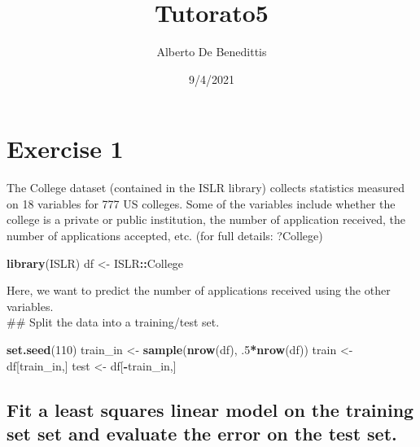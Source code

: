 \documentclass[
]{article}
\title{Tutorato5}
\author{Alberto De Benedittis}
\date{9/4/2021}
\newenvironment{Shaded}{\begin{snugshade}}{\end{snugshade}}
\newcommand{\DecValTok}[1]{\textcolor[rgb]{0.00,0.00,0.81}{#1}}
\newcommand{\FloatTok}[1]{\textcolor[rgb]{0.00,0.00,0.81}{#1}}
\newcommand{\KeywordTok}[1]{\textcolor[rgb]{0.13,0.29,0.53}{\textbf{#1}}}
\newcommand{\NormalTok}[1]{#1}
\newcommand{\OperatorTok}[1]{\textcolor[rgb]{0.81,0.36,0.00}{\textbf{#1}}}
\newcommand{\StringTok}[1]{\textcolor[rgb]{0.31,0.60,0.02}{#1}}
\begin{document}
\maketitle

\hypertarget{exercise-1}{%
\section{Exercise 1}\label{exercise-1}}

The College dataset (contained in the ISLR library) collects statistics
measured on 18 variables for 777 US colleges. Some of the variables
include whether the college is a private or public institution, the
number of application received, the number of applications accepted,
etc. (for full details: ?College)

\begin{Shaded}
\begin{Highlighting}[]
\KeywordTok{library}\NormalTok{(ISLR)}
\NormalTok{df <-}\StringTok{  }\NormalTok{ISLR}\OperatorTok{::}\NormalTok{College}
\end{Highlighting}
\end{Shaded}

Here, we want to predict the number of applications received using the
other variables.\\
\#\# Split the data into a training/test set.

\begin{Shaded}
\begin{Highlighting}[]
\KeywordTok{set.seed}\NormalTok{(}\DecValTok{110}\NormalTok{)}
\NormalTok{train_in <-}\StringTok{ }\KeywordTok{sample}\NormalTok{(}\KeywordTok{nrow}\NormalTok{(df), }\FloatTok{.5}\OperatorTok{*}\KeywordTok{nrow}\NormalTok{(df))}
\NormalTok{train <-}\StringTok{  }\NormalTok{df[train_in,]}
\NormalTok{test <-}\StringTok{  }\NormalTok{df[}\OperatorTok{-}\NormalTok{train_in,]}
\end{Highlighting}
\end{Shaded}

\hypertarget{fit-a-least-squares-linear-model-on-the-training-set-set-and-evaluate-the-error-on-the-test-set.}{%
\subsection{Fit a least squares linear model on the training set set and
evaluate the error on the test
set.}\label{fit-a-least-squares-linear-model-on-the-training-set-set-and-evaluate-the-error-on-the-test-set.}}
\end{document}
